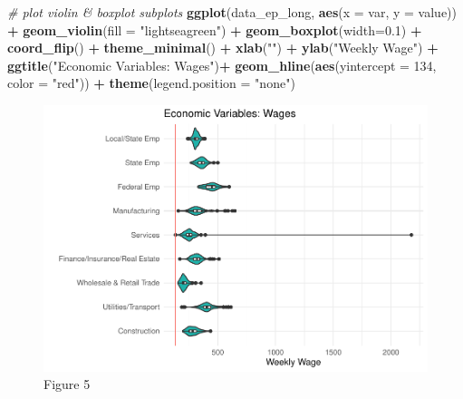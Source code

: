 \documentclass[]{article}
\newenvironment{Shaded}{\begin{snugshade}}{\end{snugshade}}
\newcommand{\CommentTok}[1]{\textcolor[rgb]{0.56,0.35,0.01}{\textit{#1}}}
\newcommand{\DataTypeTok}[1]{\textcolor[rgb]{0.13,0.29,0.53}{#1}}
\newcommand{\DecValTok}[1]{\textcolor[rgb]{0.00,0.00,0.81}{#1}}
\newcommand{\FloatTok}[1]{\textcolor[rgb]{0.00,0.00,0.81}{#1}}
\newcommand{\KeywordTok}[1]{\textcolor[rgb]{0.13,0.29,0.53}{\textbf{#1}}}
\newcommand{\NormalTok}[1]{#1}
\newcommand{\OperatorTok}[1]{\textcolor[rgb]{0.81,0.36,0.00}{\textbf{#1}}}
\newcommand{\StringTok}[1]{\textcolor[rgb]{0.31,0.60,0.02}{#1}}
\begin{document}
\begin{Shaded}
\begin{Highlighting}[]
\CommentTok{# plot violin & boxplot subplots }
\KeywordTok{ggplot}\NormalTok{(data_ep_long, }\KeywordTok{aes}\NormalTok{(}\DataTypeTok{x =}\NormalTok{ var, }\DataTypeTok{y =}\NormalTok{ value)) }\OperatorTok{+}
\StringTok{  }\KeywordTok{geom_violin}\NormalTok{(}\DataTypeTok{fill =} \StringTok{"lightseagreen"}\NormalTok{) }\OperatorTok{+}\StringTok{ }
\StringTok{  }\KeywordTok{geom_boxplot}\NormalTok{(}\DataTypeTok{width=}\FloatTok{0.1}\NormalTok{) }\OperatorTok{+}
\StringTok{  }\KeywordTok{coord_flip}\NormalTok{() }\OperatorTok{+}\StringTok{ }
\StringTok{  }\KeywordTok{theme_minimal}\NormalTok{() }\OperatorTok{+}
\StringTok{  }\KeywordTok{xlab}\NormalTok{(}\StringTok{""}\NormalTok{) }\OperatorTok{+}\StringTok{ }
\StringTok{  }\KeywordTok{ylab}\NormalTok{(}\StringTok{"Weekly Wage"}\NormalTok{) }\OperatorTok{+}
\StringTok{  }\KeywordTok{ggtitle}\NormalTok{(}\StringTok{"Economic Variables: Wages"}\NormalTok{)}\OperatorTok{+}
\StringTok{  }\KeywordTok{geom_hline}\NormalTok{(}\KeywordTok{aes}\NormalTok{(}\DataTypeTok{yintercept =} \DecValTok{134}\NormalTok{, }\DataTypeTok{color =} \StringTok{"red"}\NormalTok{)) }\OperatorTok{+}
\StringTok{  }\KeywordTok{theme}\NormalTok{(}\DataTypeTok{legend.position =} \StringTok{"none"}\NormalTok{)}
\end{Highlighting}
\end{Shaded}

\begin{figure}

{\centering \includegraphics{lab_3_final_files/figure-latex/unnamed-chunk-19-1} 

}

\caption{Figure 5}\label{fig:unnamed-chunk-19}
\end{figure}
\end{document}

